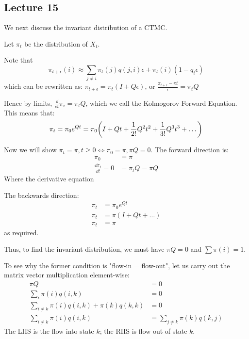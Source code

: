 \subsection{Lecture 15}

We next discuss the invariant distribution of a CTMC.
\begin{theorem} 
    Let $\pi_t$ be the distribution of $X_t$.

    Note that \[\pi_{t + \epsilon}(i) \approx \sum_{j \neq i} \pi_t(j) q(j, i) \epsilon + \pi_t(i)(1 - q_i \epsilon) \]
    which can be rewritten as: $\pi_{t + \epsilon} = \pi_t(I + Q\epsilon)$, or $\frac{\pi_{t + \epsilon} - \pi{t}}{\epsilon} = \pi_t Q$

    Hence by limits, $\frac{\dd}{\dd{t}} \pi_i = \pi_t Q$, which we call the Kolmogorov Forward Equation. This means that:
    \[ \pi_t = \pi_0 e^{Qt} = \pi_0\qty(I + Qt + \frac{1}{2!} Q^2 t^2 + \frac{1}{3!} Q^3 t^3 + \dots) \]
    
    Now we will show $\pi_t = \pi, t \geq 0 \iff \pi_0 = \pi, \pi Q = 0$. The forward direction is:
    \begin{align*}
        \pi_0 &= \pi \\
        \frac{\dd{\pi_t}}{\dd{t}} = 0 &= \pi_t Q = \pi Q
    \end{align*}
    Where the derivative equation

    The backwards direction:
    \begin{align*}
        \pi_t &= \pi_0 e^{Qt} \\
        \pi_t &= \pi (I + Qt + \dots) \\
        \pi_t &= \pi
    \end{align*}
    as required.

    Thus, to find the invariant distribution, we must have $\pi Q = 0$ and $\sum \pi(i) = 1$.
\end{theorem}

To see why the former condition is "flow-in = flow-out", let us carry out the matrix vector multiplication element-wise:
\begin{align*}
    \pi Q &= 0 \\
    \sum_{i} \pi(i) q(i, k) &= 0 \\
    \sum_{i \neq k} \pi(i) q(i, k) + \pi(k) q(k, k) &= 0 \\
    \sum_{i \neq k} \pi(i) q(i, k) &= \sum_{j \neq k} \pi(k) q(k, j) 
\end{align*}
The LHS is the flow into state $k$; the RHS is flow out of state $k$.

